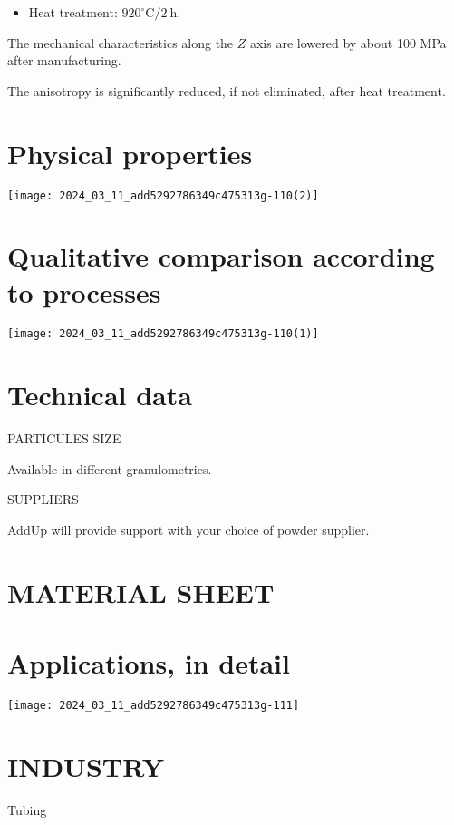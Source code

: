 \documentclass[10pt]{article}
\begin{document}
\begin{itemize}
  \item Heat treatment: $920^{\circ} \mathrm{C} / 2 \mathrm{~h}$.
\end{itemize}

The mechanical characteristics along the $Z$ axis are lowered by about 100 MPa after manufacturing.

The anisotropy is significantly reduced, if not eliminated, after heat treatment.

\section*{Physical properties}
\begin{center}
\texttt{[image: 2024\_03\_11\_add5292786349c475313g-110(2)]}
\end{center}

\section*{Qualitative comparison according to processes}
\begin{center}
\texttt{[image: 2024\_03\_11\_add5292786349c475313g-110(1)]}
\end{center}

\section*{Technical data}
PARTICULES SIZE

Available in different granulometries.

SUPPLIERS

AddUp will provide support with your choice of powder supplier.

\section*{MATERIAL SHEET}
\section*{Applications, in detail}
\begin{center}
\texttt{[image: 2024\_03\_11\_add5292786349c475313g-111]}
\end{center}

\section*{INDUSTRY}
Tubing
\end{document}
